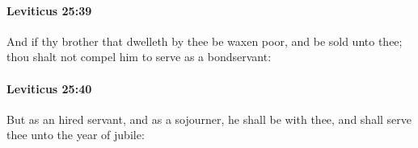 		\paragraph{Leviticus 25:39} %
			\label{LEVITICUS-25-39}

			And if thy brother that dwelleth by thee be waxen poor, and be sold unto thee; thou shalt not compel him to serve as a bondservant:


		\paragraph{Leviticus 25:40} %
			\label{LEVITICUS-25-40}

			But as an hired servant, and as a sojourner, he shall be with thee, and shall serve thee unto the year of jubile:


